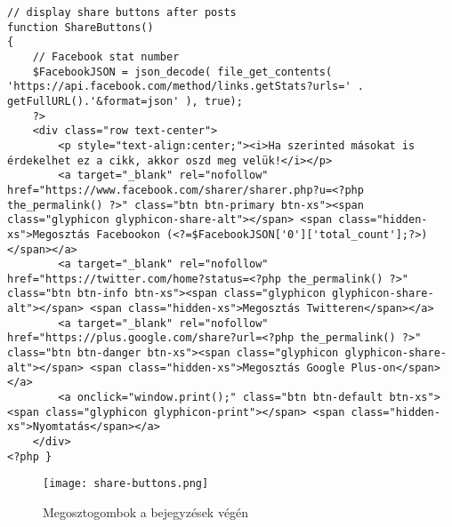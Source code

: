 \begin{lstlisting}
// display share buttons after posts
function ShareButtons()
{
	// Facebook stat number
	$FacebookJSON = json_decode( file_get_contents( 'https://api.facebook.com/method/links.getStats?urls=' . getFullURL().'&format=json' ), true);
	?>
	<div class="row text-center">
		<p style="text-align:center;"><i>Ha szerinted másokat is érdekelhet ez a cikk, akkor oszd meg velük!</i></p>
		<a target="_blank" rel="nofollow" href="https://www.facebook.com/sharer/sharer.php?u=<?php the_permalink() ?>" class="btn btn-primary btn-xs"><span class="glyphicon glyphicon-share-alt"></span> <span class="hidden-xs">Megosztás Facebookon (<?=$FacebookJSON['0']['total_count'];?>)</span></a>
		<a target="_blank" rel="nofollow" href="https://twitter.com/home?status=<?php the_permalink() ?>" class="btn btn-info btn-xs"><span class="glyphicon glyphicon-share-alt"></span> <span class="hidden-xs">Megosztás Twitteren</span></a>
		<a target="_blank" rel="nofollow" href="https://plus.google.com/share?url=<?php the_permalink() ?>" class="btn btn-danger btn-xs"><span class="glyphicon glyphicon-share-alt"></span> <span class="hidden-xs">Megosztás Google Plus-on</span></a>
		<a onclick="window.print();" class="btn btn-default btn-xs"><span class="glyphicon glyphicon-print"></span> <span class="hidden-xs">Nyomtatás</span></a>
	</div>
<?php }

\end{lstlisting}

\begin{figure}
	\texttt{[image: share-buttons.png]}
	\caption{Megosztogombok a bejegyzések végén}
\end{figure}